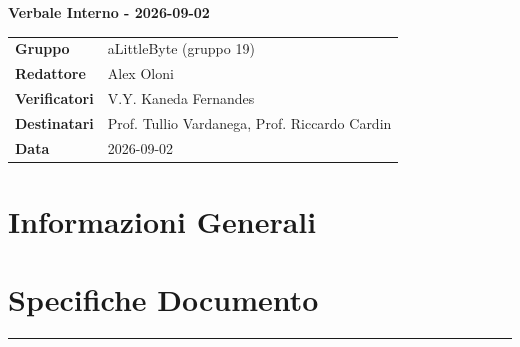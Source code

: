 \documentclass[a4paper,12pt]{article}
\begin{document}
\thispagestyle{firstpage}

\vspace*{0.5cm}

\begin{center}
    {\LARGE \textbf{Verbale Interno - 2026-09-02}}
\end{center}

\vspace{1.5cm}

\begin{center}
    \renewcommand{\arraystretch}{1.3}
    \begin{tcolorbox}[
        width=0.92\textwidth,
        colback=gray!6,
        colframe=gray!45,
        boxrule=0.5pt,
        arc=2mm,
        boxsep=0pt,
        left=8pt, right=8pt, top=8pt, bottom=8pt
    ]
        \begin{tabularx}{\linewidth}{>{\bfseries}p{3.5cm} X}
            Gruppo      & aLittleByte (gruppo 19) \\
            Redattore   & Alex Oloni \\
            Verificatori & V.Y. Kaneda Fernandes\\
            Destinatari & Prof. Tullio Vardanega, Prof. Riccardo Cardin \\
            Data        & 2026-09-02\\
        \end{tabularx}
    \end{tcolorbox}
\end{center}

\newpage

\tableofcontents
\newpage
\section{Informazioni Generali}
\section*{Specifiche Documento}
\hrule
\vspace{1cm}
\end{document}
